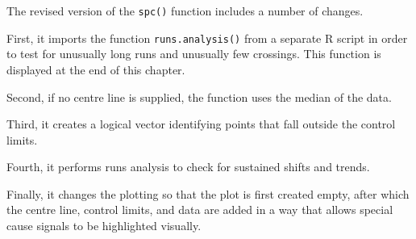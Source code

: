 \documentclass[
]{book}
\begin{document}
The revised version of the \texttt{spc()} function includes a number of changes.

First, it imports the function \texttt{runs.analysis()} from a separate R script in order to test for unusually long runs and unusually few crossings. This function is displayed at the end of this chapter.

Second, if no centre line is supplied, the function uses the median of the data.

Third, it creates a logical vector identifying points that fall outside the control limits.

Fourth, it performs runs analysis to check for sustained shifts and trends.

Finally, it changes the plotting so that the plot is first created empty, after which the centre line, control limits, and data are added in a way that allows special cause signals to be highlighted visually.
\end{document}
